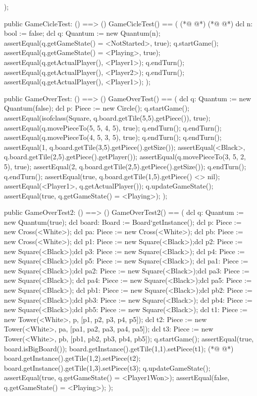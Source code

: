\begin{vdmpp}[breaklines=true]
  );
  
  public GameCicleTest: () ==> ()
 GameCicleTest() == (
(*@
\label{GameOverTest2:356}
@*)
(*@
\label{testAll:356}
@*)
  dcl n: bool := false;
  dcl q: Quantum := new Quantum(n);
  assertEqual(q.getGameState() = <NotStarted>, true);
  q.startGame();
  assertEqual(q.getGameState() = <Playing>, true);
  assertEqual(q.getActualPlayer(), <Player1>);
  q.endTurn();
  assertEqual(q.getActualPlayer(), <Player2>);
  q.endTurn();
  assertEqual(q.getActualPlayer(), <Player1>);
 );
 
 public GameOverTest: () ==> ()
 GameOverTest() == (
  dcl q: Quantum := new Quantum(false);
  dcl p: Piece := new Circle();
  q.startGame();
  assertEqual(isofclass(Square, q.board.getTile(5,5).getPiece()), true);
  assertEqual(q.movePieceTo(5, 5, 4, 5), true);
  q.endTurn(); q.endTurn();
  assertEqual(q.movePieceTo(4, 5, 3, 5), true);
  q.endTurn(); q.endTurn();
  assertEqual(1, q.board.getTile(3,5).getPiece().getSize());
  assertEqual(<Black>, q.board.getTile(2,5).getPiece().getPlayer());
  assertEqual(q.movePieceTo(3, 5, 2, 5), true);
  assertEqual(2, q.board.getTile(2,5).getPiece().getSize());
  q.endTurn(); q.endTurn();
  assertEqual(true, q.board.getTile(1,5).getPiece() <> nil);
  assertEqual(<Player1>, q.getActualPlayer());
  q.updateGameState();
  assertEqual(true, q.getGameState() = <Playing>);
 );
  
  public GameOverTest2: () ==> ()
 GameOverTest2() == (
  dcl q: Quantum := new Quantum(true);
  dcl board: Board := Board`getInstance();
  dcl p: Piece := new Cross(<White>);
  dcl pa: Piece := new Cross(<White>);
  dcl pb: Piece := new Cross(<White>);
  dcl p1: Piece := new Square(<Black>);dcl p2: Piece := new Square(<Black>);dcl p3: Piece := new Square(<Black>);
  dcl p4: Piece := new Square(<Black>);dcl p5: Piece := new Square(<Black>);
  dcl pa1: Piece := new Square(<Black>);dcl pa2: Piece := new Square(<Black>);dcl pa3: Piece := new Square(<Black>);
  dcl pa4: Piece := new Square(<Black>);dcl pa5: Piece := new Square(<Black>);
  dcl pb1: Piece := new Square(<Black>);dcl pb2: Piece := new Square(<Black>);dcl pb3: Piece := new Square(<Black>);
  dcl pb4: Piece := new Square(<Black>);dcl pb5: Piece := new Square(<Black>);
  dcl t1: Piece := new Tower(<White>, p, [p1, p2, p3, p4, p5]);
  dcl t2: Piece := new Tower(<White>, pa, [pa1, pa2, pa3, pa4, pa5]);
  dcl t3: Piece := new Tower(<White>, pb, [pb1, pb2, pb3, pb4, pb5]);
  q.startGame();
  assertEqual(true, board.isBigBoard());
  board.getInstance().getTile(1,1).setPiece(t1);
(*@
\label{GameOverTest3:408}
@*)
  board.getInstance().getTile(1,2).setPiece(t2);
  board.getInstance().getTile(1,3).setPiece(t3);
  q.updateGameState();
  assertEqual(true, q.getGameState() = <Player1Won>);
  assertEqual(false, q.getGameState() = <Playing>);
 );
   

\end{vdmpp}
